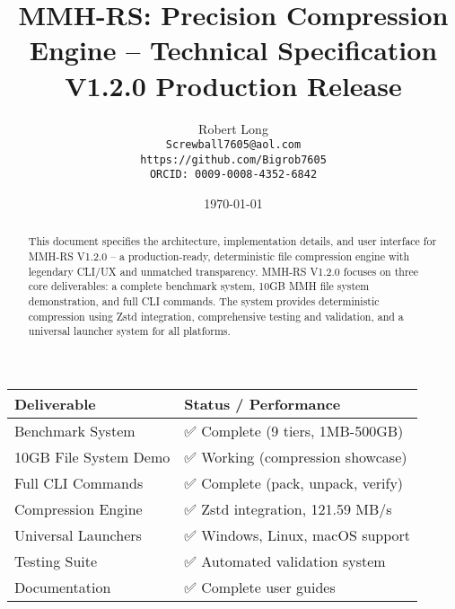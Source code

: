 \documentclass[11pt,a4paper]{article}
\title{MMH-RS: Precision Compression Engine -- Technical Specification\\[1ex]\textbf{\large V1.2.0 Production Release}}
\author{Robert Long \\ \texttt{Screwball7605@aol.com} \\ \texttt{https://github.com/Bigrob7605} \\ \texttt{ORCID: 0009-0008-4352-6842}}
\date{\today}
\begin{document}
	\maketitle
	\thispagestyle{empty}
	\begin{abstract}
		This document specifies the architecture, implementation details, and user interface for MMH-RS V1.2.0 -- a production-ready, deterministic file compression engine with legendary CLI/UX and unmatched transparency. MMH-RS V1.2.0 focuses on three core deliverables: a complete benchmark system, 10GB MMH file system demonstration, and full CLI commands. The system provides deterministic compression using Zstd integration, comprehensive testing and validation, and a universal launcher system for all platforms.
	\end{abstract}

	\begin{center}
	\begin{tcolorbox}[colback=gray!5, colframe=gray!60, boxrule=0.7pt, arc=2pt, title=\textbf{\large MMH-RS V1.2.0 Core Deliverables}]
	\begin{tabular}{@{}ll@{}}
	\toprule
	\textbf{Deliverable} & \textbf{Status / Performance} \\
	\midrule
	Benchmark System     & ✅ Complete (9 tiers, 1MB-500GB) \\
	10GB File System Demo & ✅ Working (compression showcase) \\
	Full CLI Commands    & ✅ Complete (pack, unpack, verify) \\
	Compression Engine   & ✅ Zstd integration, 121.59 MB/s \\
	Universal Launchers  & ✅ Windows, Linux, macOS support \\
	Testing Suite        & ✅ Automated validation system \\
	Documentation        & ✅ Complete user guides \\
	\bottomrule
	\end{tabular}
	\end{tcolorbox}
	\end{center}
\end{document}
